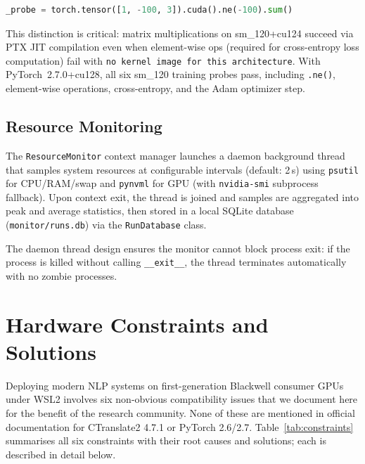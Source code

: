 \documentclass[conference]{IEEEtran}
\begin{document}
\begin{lstlisting}[language=Python, caption={Training CUDA probe (not matmul).}]
_probe = torch.tensor([1, -100, 3]).cuda().ne(-100).sum()
\end{lstlisting}

This distinction is critical: matrix multiplications on sm\_120+cu124 succeed via
PTX JIT compilation even when element-wise ops (required for cross-entropy loss
computation) fail with \texttt{no kernel image for this architecture}.
With PyTorch~2.7.0+cu128, all six sm\_120 training probes pass, including
\texttt{.ne()}, element-wise operations, cross-entropy, and the Adam optimizer step.

\subsection{Resource Monitoring}

The \texttt{ResourceMonitor} context manager launches a daemon background thread that
samples system resources at configurable intervals (default: 2\,s) using \texttt{psutil}
for CPU/RAM/swap and \texttt{pynvml} for GPU (with \texttt{nvidia-smi} subprocess
fallback). Upon context exit, the thread is joined and samples are aggregated into
peak and average statistics, then stored in a local SQLite database
(\texttt{monitor/runs.db}) via the \texttt{RunDatabase} class.

The daemon thread design ensures the monitor cannot block process exit: if the process
is killed without calling \texttt{\_\_exit\_\_}, the thread terminates automatically
with no zombie processes.

\section{Hardware Constraints and Solutions}
\label{sec:constraints}

Deploying modern NLP systems on first-generation Blackwell consumer GPUs under
WSL2 involves six non-obvious compatibility issues that we document here for
the benefit of the research community. None of these are mentioned in official
documentation for CTranslate2 4.7.1 or PyTorch 2.6/2.7.
Table~\ref{tab:constraints} summarises all six constraints with their root causes
and solutions; each is described in detail below.
\end{document}
